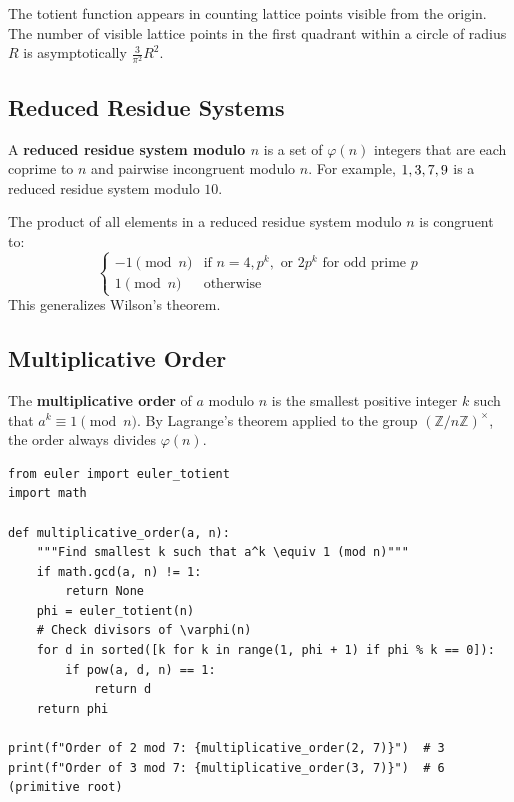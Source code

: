 The totient function appears in counting lattice points visible from the origin. The number of visible lattice points in the first quadrant within a circle of radius $R$ is asymptotically $\frac{3}{\pi^2} R^2$.

\subsection{Reduced Residue Systems}

A \textbf{reduced residue system modulo $n$} is a set of $\varphi(n)$ integers that are each coprime to $n$ and pairwise incongruent modulo $n$. For example, $\\{1, 3, 7, 9\\}$ is a reduced residue system modulo $10$.

\begin{theorem}
The product of all elements in a reduced residue system modulo $n$ is congruent to:
\[
\begin{cases}
-1 \pmod{n} & \text{if } n = 4, p^k, \text{ or } 2p^k \text{ for odd prime } p \\
1 \pmod{n} & \text{otherwise}
\end{cases}
\]
This generalizes Wilson's theorem.
\end{theorem}

\subsection{Multiplicative Order}

The \textbf{multiplicative order} of $a$ modulo $n$ is the smallest positive integer $k$ such that $a^k \equiv 1 \pmod{n}$. By Lagrange's theorem applied to the group $(\mathbb{Z}/n\mathbb{Z})^\times$, the order always divides $\varphi(n)$.

\begin{lstlisting}[caption={Computing multiplicative order}, label=lst:order]
from euler import euler_totient
import math

def multiplicative_order(a, n):
    """Find smallest k such that a^k \equiv 1 (mod n)"""
    if math.gcd(a, n) != 1:
        return None
    phi = euler_totient(n)
    # Check divisors of \varphi(n)
    for d in sorted([k for k in range(1, phi + 1) if phi % k == 0]):
        if pow(a, d, n) == 1:
            return d
    return phi

print(f"Order of 2 mod 7: {multiplicative_order(2, 7)}")  # 3
print(f"Order of 3 mod 7: {multiplicative_order(3, 7)}")  # 6 (primitive root)
\end{lstlisting}

